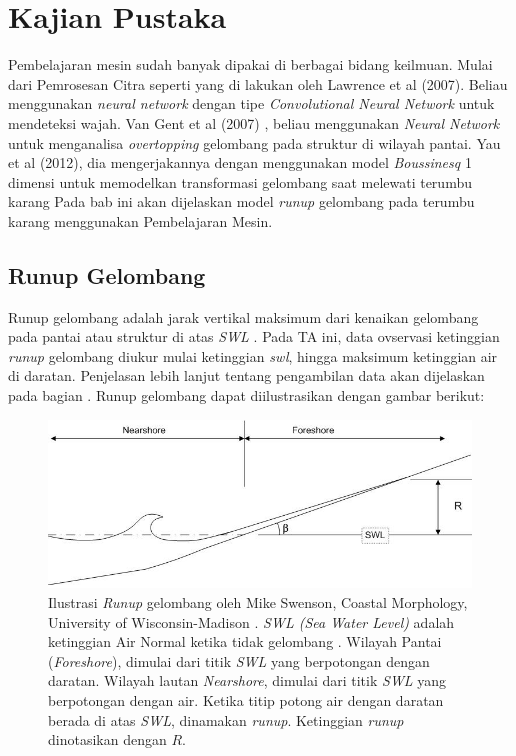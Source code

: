 \chapter{Kajian Pustaka}

    Pembelajaran mesin sudah banyak dipakai di berbagai bidang keilmuan. Mulai dari Pemrosesan Citra seperti yang di lakukan oleh Lawrence et al (2007)\cite{lawrence1997face}. Beliau menggunakan \emph{neural network} dengan tipe \emph{Convolutional Neural Network} untuk mendeteksi wajah. Van Gent et al (2007) \cite{van2007neural}, beliau menggunakan \emph{Neural Network} untuk menganalisa \emph{overtopping} gelombang pada struktur di wilayah pantai. Yau et al (2012)\cite{YAO201230}, dia mengerjakannya dengan menggunakan model \emph{Boussinesq} 1 dimensi untuk memodelkan transformasi gelombang saat melewati terumbu karang Pada bab ini akan dijelaskan model \emph{runup} gelombang pada terumbu karang menggunakan Pembelajaran Mesin.

\section{Runup Gelombang}

    Runup gelombang adalah jarak vertikal maksimum dari kenaikan gelombang pada pantai atau struktur di atas \emph{SWL} \cite{sorensen2005basic}. Pada TA ini, data ovservasi ketinggian \emph{runup} gelombang diukur mulai ketinggian \emph{swl}, hingga maksimum ketinggian air di daratan. Penjelasan lebih lanjut tentang pengambilan data akan dijelaskan pada bagian . Runup gelombang dapat diilustrasikan dengan gambar berikut:

    \begin{figure}
        \begin{center}
            \includegraphics[scale=0.7]{./images/runup_gelombang.jpg}
        \end{center}
        \caption{Ilustrasi \emph{Runup} gelombang oleh Mike Swenson, Coastal Morphology, University of Wisconsin-Madison \cite{MikeSwenson:WaveRunup}. \emph{SWL (Sea Water Level)} adalah ketinggian Air Normal ketika tidak gelombang . Wilayah Pantai (\emph{Foreshore}), dimulai dari titik \emph{SWL} yang berpotongan dengan daratan. Wilayah lautan \emph{Nearshore}, dimulai dari titik \emph{SWL} yang berpotongan dengan air. Ketika titip potong air dengan daratan berada di atas \emph{SWL}, dinamakan \emph{runup}. Ketinggian \emph{runup} dinotasikan dengan $R$.}
    \end{figure}
    \FloatBarrier

